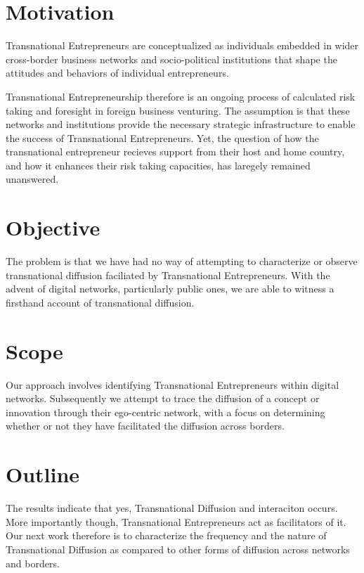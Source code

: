 \section{Motivation}
Transnational Entrepreneurs are conceptualized as individuals embedded
in wider cross-border business networks and socio-political
institutions that shape the attitudes and behaviors of individual
entrepreneurs.

Transnational Entrepreneurship therefore is an ongoing process of
calculated risk taking and foresight in foreign business
venturing. The assumption is that these networks and institutions
provide the necessary strategic infrastructure to enable the success
of Transnational Entrepreneurs. Yet, the question of how the
transnational entrepreneur recieves support from their host and home
country, and how it enhances their risk taking capacities, has
laregely remained unanswered.

\section{Objective}
The problem is that we have had no way of attempting to characterize
or observe transnational diffusion faciliated by Transnational
Entrepreneurs. With the advent of digital networks, particularly
public ones, we are able to witness a firsthand account of
transnational diffusion.

\section{Scope}
Our approach involves identifying Transnational Entrepreneurs within
digital networks. Subsequently we attempt to trace the diffusion of a
concept or innovation through their ego-centric network, with a focus
on determining whether or not they have facilitated the diffusion
across borders.

\section{Outline}
The results indicate that yes, Transnational Diffusion and interaciton
occurs. More importantly though, Transnational Entrepreneurs act as
facilitators of it. Our next work therefore is to characterize the
frequency and the nature of Transnational Diffusion as compared to
other forms of diffusion across networks and borders.

